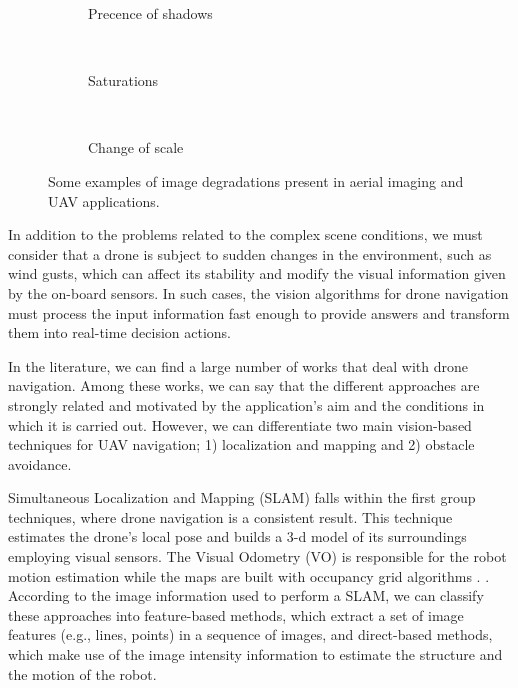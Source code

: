 \begin{figure}[!ht]
    \centering
    \begin{subfigure}[b]{0.38\textwidth}
        \caption{Precence of shadows}
    \end{subfigure}
        ~ %
    \begin{subfigure}[b]{0.38\textwidth}
        \caption{Saturations}
    \end{subfigure}
        ~ %
    \begin{subfigure}[b]{0.38\textwidth}
        \caption{Change of scale}
    \end{subfigure} 
    \caption{Some examples of image degradations present in aerial imaging and UAV applications.}\label{fig:img_drone_degradations}
\end{figure}

In addition to the problems related to the complex scene conditions, we must consider that a drone is subject to sudden changes in the environment, such as wind gusts, which can affect its stability and modify the visual information given by the on-board sensors. In such cases, the vision algorithms for drone navigation must process the input information fast enough to provide answers and transform them into real-time decision actions.

In the literature, we can find a large number of works that deal with drone navigation. Among these works, we can say that the different approaches are strongly related and motivated by the application's aim and the conditions in which it is carried out. However, we can differentiate two main vision-based techniques for UAV navigation; 1) localization and mapping and 2) obstacle avoidance.

Simultaneous Localization and Mapping (SLAM) falls within the first group techniques, where drone navigation is a consistent result. This technique estimates the drone's local pose and builds a 3-d model of its surroundings employing visual sensors.  The Visual Odometry (VO) \citep{Scaramuzza.Fraundorfer:RAM:2011} is responsible for the robot motion estimation while the maps are built with occupancy grid algorithms \citep{Thrun.Bu:AI:1996}. . According to the image information used to perform a SLAM, we can classify these approaches into feature-based methods, which extract a set of image features (e.g., lines, points) in a sequence of images, and direct-based methods, which make use of the image intensity information to estimate the structure and the motion of the robot.

